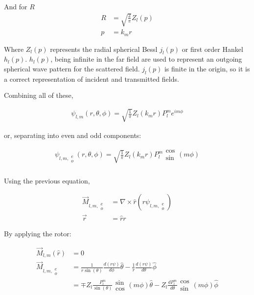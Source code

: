             And for $R$
            \begin{align}
                R &= \sqrt{\frac{2}{\pi}}Z_l(p) \\
                p &= k_m r
            \end{align}

            Where $Z_l(p)$ represents the radial spherical Bessl $j_l(p)$ or first order Hankel $h_l(p)$. $h_l(p)$, being infinite in
            the far field are used to represent an outgoing spherical wave pattern for the scattered field. $j_l(p)$ is finite in the
            origin, so it is a correct representation of incident and transmitted fields.

            Combining all of these,

            \begin{align}
                \psi_{l,m}(r, \theta, \phi) = \sqrt{\frac{1}{\pi}}Z_l(k_m r)P_l^m e^{im\phi}
            \end{align}

            or, separating into even and odd components:

            \begin{align}
                \psi_{l,m,\substack{e\\ o}}(r, \theta, \phi) = \sqrt{\frac{1}{\pi}}Z_l(k_m r)P_l^m \substack{\cos\\\sin}(m\phi)
            \end{align}

        \subsubsection{}

            Using the previous equation,

            \begin{align}
                \vec{M}_{l,m, \substack{e \\ o}} &= \nabla \times \hat{r}(r \psi_{l, m, \substack{e \\ o }})\\
                \vec{r} &= \hat{r}r
            \end{align}

            By applying the rotor:

            \begin{align}
                \vec{M}_{l,m}(\hat{r}) &= 0 \\
                \vec{M}_{l,m, \substack{e \\ o}} &= \frac{1}{r\sin(\theta)}\frac{d(r\psi)}{d\phi}\hat{\theta} - \frac{1}{r}\frac{d(r\psi)}{d\theta}\hat{\phi} \\
                &= \mp Z_l\frac{P^m_l}{\sin(\theta)}\substack{\sin \\\cos}(m\phi)\hat{\theta} - Z_l\frac{dP^m_l}{d\theta}\substack{\cos \\ \sin}(m\phi)\hat{\phi}
            \end{align}

